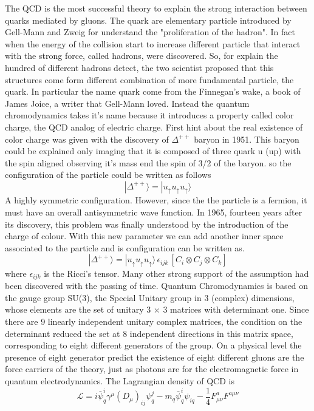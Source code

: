 \documentclass[12pt,a4paper]{book}
\begin{document}
	 
	The QCD is the most successful theory to explain the strong interaction between quarks mediated by gluons. The quark are elementary particle introduced by Gell-Mann and Zweig for understand the "proliferation of the hadron". In fact when the energy of the collision start to increase different particle that interact with the strong force, called hadrons, were discovered. So, for explain the hundred of different hadrons detect, the two scientist proposed that this structures come form different combination of more fundamental particle, the quark. In particular the name quark come from the Finnegan's wake, a book of James Joice, a writer that Gell-Mann loved. Instead the quantum chromodynamics takes it's name because it introduces a property called color charge, the QCD analog of electric charge. 
	First hint about the real existence of color charge was given with the discovery of $\Delta^{++}$ baryon in 1951.  This baryon could be explained only imaging that it is composed of three quark u (up) with the spin aligned observing it's mass end the spin of 3/2 of the baryon. so the configuration of the particle could be written as follows 
	\[
	|\Delta^{++}\rangle = | u_{\uparrow} u_{\uparrow} u_{\uparrow} \rangle
	\]
	A highly symmetric configuration. However, since the the particle is a fermion, it must have an overall antisymmetric wave function. In 1965, fourteen years after its discovery, this problem was finally understood by the introduction of the charge of colour. With this new parameter we can add another inner space associated to the particle and is configuration can be written as.
	\[
	|\Delta^{++}\rangle = | u_{\uparrow} u_{\uparrow} u_{\uparrow} \rangle \, \epsilon_{ijk} \, \left[ C_i \otimes C_j \otimes C_k \right]
	\]
	where $\epsilon_{ijk}$ is the Ricci's tensor. Many other strong support of the assumption had been discovered with the passing of time. Quantum Chromodynamics is based on the gauge group SU(3), the Special Unitary group in 3 (complex) dimensions, whose elements are the set of unitary 3 × 3 matrices with determinant one. Since there are 9 linearly independent unitary complex matrices, the condition on the determinant reduced the set at 8 independent directions in this matrix space, corresponding to eight different generators of the group. On a physical level the presence of eight generator predict the existence of eight different gluons are the force carriers of the theory, just as photons are for the electromagnetic force in quantum electrodynamics.  The Lagrangian density of QCD is
	\begin{equation}
		\boxed{\mathcal{L}= i \bar{\psi}^i_q \gamma^\mu(D_\mu)_{ij}\psi^j_q- m_q \bar{\psi}^i_q \psi_{iq}-\frac{1}{4} F^a_{\mu \nu} F^{a\mu \nu}}
		\label{eq:QCD_lagrangian}
	\end{equation} 
\end{document}
